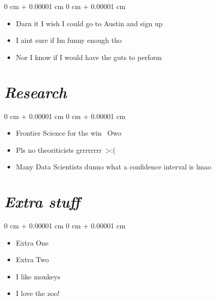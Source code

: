\documentclass[10pt, letterpaper]{article}
\newenvironment{highlights}{
    \begin{itemize}[
        topsep=0.10 cm,
        parsep=0.1 cm,
        partopsep=0pt,
        itemsep=0pt,
        leftmargin=0 cm + 15pt
    ]
}{
    \end{itemize}
} %
\newenvironment{onecolentry}{
    \begin{adjustwidth}{
        0 cm + 0.00001 cm
    }{
        0 cm + 0.00001 cm
    }
}{
    \end{adjustwidth}
} %
\begin{document}
        \vspace{0.1 cm}
        \begin{onecolentry}
            \begin{highlights}
                \item Darn it I wish I could go to Austin and sign up
                \item I aint sure if Im funny enough tho
                \item Nor I know if I would have the guts to perform
        \end{highlights}
        \end{onecolentry}


\vspace{0.2 cm}


\section{\textbf{\textit{Research}}} 

\vspace{0 cm}

\begin{onecolentry}
    \begin{highlights}
        \item Frontier Science for the win \ Owo
        \item Pls no theoriticists grrrrrrrr\ >:(
        \item Many Data Scientists dunno what a confidence interval is lmao
    \end{highlights}
\end{onecolentry}


\vspace{0.2 cm}


\section{\textit{Extra stuff}}

\vspace{0 cm}

\begin{onecolentry}
    \begin{highlights}
        \item Extra One
        \item Extra Two
        \item I like monkeys
        \item I love the zoo!
    \end{highlights}
\end{onecolentry}
\end{document}
